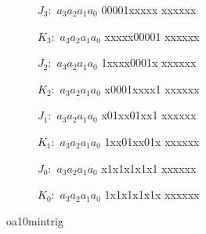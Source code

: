 
\begin{figure}[H]
	\begin{subfigure}[b]{0.3\textwidth}
	{$J_3:$}%
	{{$a_3$}{$a_2$}{$a_1$}{$a_0$}}%
	{00001xxxxx%
	 xxxxxx}%
	{%
	}
	\caption{}
	\label{figure:oa10_min_J3}
	\end{subfigure}
	\qquad
	\begin{subfigure}[b]{0.3\textwidth}
	{$K_3:$}%
	{{$a_3$}{$a_2$}{$a_1$}{$a_0$}}%
	{xxxxx00001%
	 xxxxxx}%
	{%
	}
	\caption{}
	\label{figure:oa10_min_K3}
	\end{subfigure}

	\begin{subfigure}[b]{0.3\textwidth}
	{$J_2:$}%
	{{$a_3$}{$a_2$}{$a_1$}{$a_0$}}%
	{1xxxx0001x%
	 xxxxxx}%
	{%
	}
	\caption{}
	\label{figure:oa10_min_J2}
	\end{subfigure}
	\qquad
	\begin{subfigure}[b]{0.3\textwidth}
	{$K_2:$}%
	{{$a_3$}{$a_2$}{$a_1$}{$a_0$}}%
	{x0001xxxx1%
	 xxxxxx}%
	{%
	}
	\caption{}
	\label{figure:oa10_min_K2}
	\end{subfigure}	

	\begin{subfigure}[b]{0.3\textwidth}
	{$J_1:$}%
	{{$a_3$}{$a_2$}{$a_1$}{$a_0$}}%
	{x01xx01xx1%
	 xxxxxx}%
	{%
	}
	\caption{}
	\label{figure:oa10_min_J1}
	\end{subfigure}
	\qquad
	\begin{subfigure}[b]{0.3\textwidth}
	{$K_1:$}%
	{{$a_3$}{$a_2$}{$a_1$}{$a_0$}}%
	{1xx01xx01x%
	 xxxxxx}%
	{%
	}
	\caption{}
	\label{figure:oa10_min_K1}
	\end{subfigure}

	\begin{subfigure}[b]{0.3\textwidth}
	{$J_0:$}%
	{{$a_3$}{$a_2$}{$a_1$}{$a_0$}}%
	{x1x1x1x1x1%
	 xxxxxx}%
	{%
	}
	\caption{}
	\label{figure:oa10_min_J0}
	\end{subfigure}
	\qquad
	\begin{subfigure}[b]{0.3\textwidth}
	{$K_0:$}%
	{{$a_3$}{$a_2$}{$a_1$}{$a_0$}}%
	{1x1x1x1x1x%
	 xxxxxx}%
	{%
	}
	\caption{}
	\label{figure:oa10_min_K0}
	\end{subfigure}	
	
	\caption{oa10mintrig}
	\label{figure:oa10_min_trig}
\end{figure}

